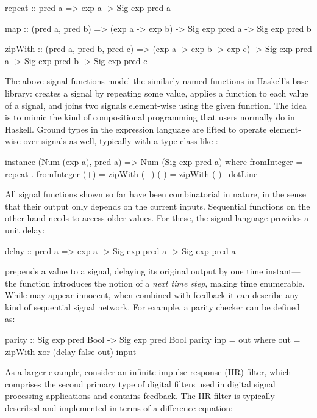 \documentclass[../paper.tex]{subfiles}
\begin{document}
\begin{code}
repeat :: pred a => exp a -> Sig exp pred a

map :: (pred a, pred b) => (exp a -> exp b) ->
  Sig exp pred a -> Sig exp pred b

zipWith :: (pred a, pred b, pred c) => (exp a -> exp b -> exp c) ->
  Sig exp pred a -> Sig exp pred b -> Sig exp pred c
\end{code}

The above signal functions model the similarly named functions in Haskell's base library:  creates a signal by repeating some value,  applies a function to each value of a signal, and  joins two signals element-wise using the given function. The idea is to mimic the kind of compositional programming that users normally do in Haskell. Ground types in the expression language are lifted to operate element-wise over signals as well, typically with a type class like :

\begin{code}
instance (Num (exp a), pred a) => Num (Sig exp pred a) where
  fromInteger = repeat . fromInteger
  (+)         = zipWith (+)
  (-)         = zipWith (-)
  --dotLine
\end{code}

All signal functions shown so far have been combinatorial in nature, in the sense that their output only depends on the current inputs. Sequential functions on the other hand needs to access older values. For these, the signal language provides a unit delay:

\begin{code}
delay :: pred a => exp a -> Sig exp pred a -> Sig exp pred a
\end{code}

\noindent {} prepends a value to a signal, delaying its original output by one time instant---the function introduces the notion of a \emph{next time step}, making time enumerable. While  may appear innocent, when combined with feedback it can describe any kind of sequential signal network. For example, a parity checker can be defined as:

\begin{code}
parity :: Sig exp pred Bool -> Sig exp pred Bool
parity inp = out where out = zipWith xor (delay false out) input
\end{code}

As a larger example, consider an infinite impulse response (IIR) filter, which comprises the second primary type of digital filters used in digital signal processing applications and contains feedback. The IIR filter is typically described and implemented in terms of a difference equation:
\end{document}
